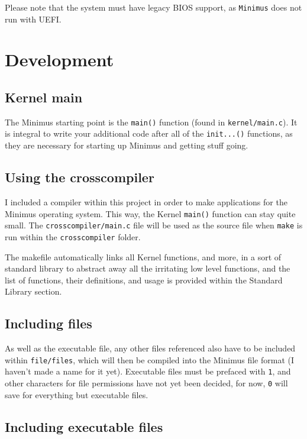 \documentclass{article}
\begin{document}
Please note that the system must have legacy BIOS support, as \verb|Minimus| does
not run with UEFI.

\section{Development}

\subsection{Kernel main}

The Minimus starting point is the \verb|main()| function (found in
\verb|kernel/main.c|). It is integral to write your additional code after
all of the \verb|init...()| functions, as they are necessary for starting
up Minimus and getting stuff going.

\subsection{Using the crosscompiler}

I included a compiler within this project in order to make applications for
the Minimus operating system. This way, the Kernel \verb|main()| function can
stay quite small.
The \verb|crosscompiler/main.c| file will be used as the source file when
\verb|make| is run within the \verb|crosscompiler| folder.

The makefile automatically links all Kernel functions, and more, in a sort
of standard library to abstract away all the irritating low level functions,
and the list of functions, their definitions, and usage is provided within
the Standard Library section.

\subsection{Including files}

As well as the executable file, any other files referenced also have to be
included within \verb|file/files|, which will then be compiled into the
Minimus file format (I haven't made a name for it yet). Executable files
must be prefaced with \verb|1|, and other characters for file permissions
have not yet been decided, for now, \verb|0| will save for everything but
executable files.

\subsection{Including executable files}
\end{document}
